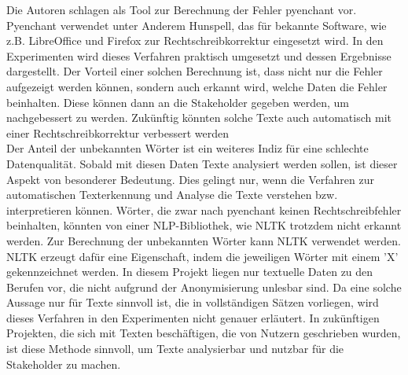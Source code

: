 Die Autoren schlagen als Tool zur Berechnung der Fehler pyenchant vor. \cite{https://pypi.org/project/pyenchant/}
Pyenchant verwendet unter Anderem Hunspell,\cite{https://abiword.github.io/enchant/} das für bekannte Software, wie z.B. LibreOffice und Firefox zur Rechtschreibkorrektur eingesetzt wird. \cite{http://hunspell.github.io/}
In den Experimenten wird dieses Verfahren praktisch umgesetzt und dessen Ergebnisse dargestellt. 
Der Vorteil einer solchen Berechnung ist, dass nicht nur die Fehler aufgezeigt werden können, sondern auch erkannt wird, welche Daten die Fehler beinhalten. 
Diese können dann an die Stakeholder gegeben werden, um nachgebessert zu werden.
Zukünftig könnten solche Texte auch automatisch mit einer Rechtschreibkorrektur verbessert werden \cite{kiefer2019} \\

Der Anteil der unbekannten Wörter ist ein weiteres Indiz für eine schlechte Datenqualität. \cite{kiefer2019}
Sobald mit diesen Daten Texte analysiert werden sollen, ist dieser Aspekt von besonderer Bedeutung.    Dies gelingt nur, wenn die Verfahren zur automatischen Texterkennung und Analyse die Texte verstehen bzw. interpretieren können. 
Wörter, die zwar nach pyenchant keinen Rechtschreibfehler beinhalten, könnten von einer NLP-Bibliothek, wie NLTK trotzdem nicht erkannt werden. 
Zur Berechnung der unbekannten Wörter kann NLTK verwendet werden. \cite{kiefer2019}
NLTK erzeugt dafür eine Eigenschaft, indem die jeweiligen Wörter mit einem 'X' gekennzeichnet werden. \cite{kiefer2019}
In diesem Projekt liegen nur textuelle Daten zu den Berufen vor, die nicht aufgrund der Anonymisierung unlesbar sind. 
Da eine solche Aussage nur für Texte sinnvoll ist, die in vollständigen Sätzen vorliegen, wird dieses Verfahren in den Experimenten nicht genauer erläutert. 
In zukünftigen Projekten, die sich mit Texten beschäftigen, die von Nutzern geschrieben wurden, ist diese Methode sinnvoll, um Texte analysierbar und nutzbar für die Stakeholder zu machen. 







